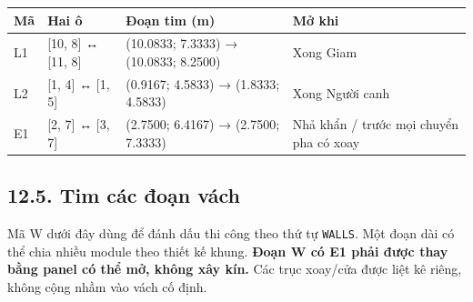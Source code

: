 \documentclass[
  11pt,
  a4paper,
]{article}
\newcounter{none} %
\begin{document}
{\def\LTcaptype{none} %
\begin{longtable}[]{@{}
  >{\raggedright\arraybackslash}p{}
  >{\raggedright\arraybackslash}p{}
  >{\raggedright\arraybackslash}p{}
  >{\raggedright\arraybackslash}p{}@{}}
\toprule\noalign{}
\begin{minipage}[b]{\linewidth}\raggedright
Mã
\end{minipage} & \begin{minipage}[b]{\linewidth}\raggedright
Hai ô
\end{minipage} & \begin{minipage}[b]{\linewidth}\raggedright
Đoạn tim (m)
\end{minipage} & \begin{minipage}[b]{\linewidth}\raggedright
Mở khi
\end{minipage} \\
\midrule\noalign{}
\endhead
\bottomrule\noalign{}
\endlastfoot
L1 & {[}10, 8{]} ↔ {[}11, 8{]} & (10.0833; 7.3333) → (10.0833; 8.2500) &
Xong Giam \\
L2 & {[}1, 4{]} ↔ {[}1, 5{]} & (0.9167; 4.5833) → (1.8333; 4.5833) &
Xong Người canh \\
E1 & {[}2, 7{]} ↔ {[}3, 7{]} & (2.7500; 6.4167) → (2.7500; 7.3333) & Nhả
khẩn / trước mọi chuyển pha có xoay \\
\end{longtable}
}

\subsection{12.5. Tim các đoạn
vách}\label{tim-cuxe1c-ux111oux1ea1n-vuxe1ch}

Mã W dưới đây dùng để đánh dấu thi công theo thứ tự \texttt{WALLS}. Một
đoạn dài có thể chia nhiều module theo thiết kế khung. \textbf{Đoạn W có
E1 phải được thay bằng panel có thể mở, không xây kín.} Các trục
xoay/cửa được liệt kê riêng, không cộng nhầm vào vách cố định.
\end{document}
